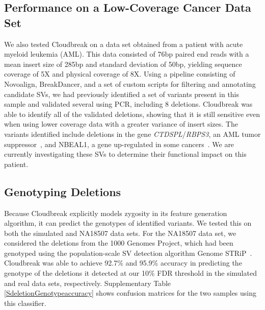 \documentclass{bioinfo}
\newcommand{\todo}[1]{}
\begin{document}
\subsection{Performance on a Low-Coverage Cancer Data Set}

We also tested Cloudbreak on a data set obtained from a patient with acute myeloid leukemia (AML). This data consisted of 76bp paired end reads with a mean insert size of 285bp and standard deviation of 50bp, yielding sequence coverage of 5X and physical coverage of 8X. Using a pipeline consisting of Novoalign, BreakDancer, and a set of custom scripts for filtering and annotating candidate SVs, we had previously identified a set of variants present in this sample and validated several using PCR, including 8 deletions. Cloudbreak was able to identify all of the validated deletions, showing that it is still sensitive even when using lower coverage data with a greater variance of insert sizes. The variants identified include deletions in the gene \emph{CTDSPL}/\emph{RBPS3}, an AML tumor suppressor~\citep{Zheng:2012kk}, and NBEAL1, a gene up-regulated in some cancers~\citep{Chen:2004jo}. We are currently investigating these SVs to determine their functional impact on this patient. 

\subsection{Genotyping Deletions}\label{section_results_genotyping}

Because Cloudbreak explicitly models zygosity in its feature generation algorithm, it can predict the genotypes of identified variants. We tested this on both the simulated and NA18507 data sets. For the NA18507 data set, we considered the deletions from the 1000 Genomes Project, which had been genotyped using the population-scale SV detection algorithm Genome STRiP~\citep{Handsaker:2011ki}. Cloudbreak was able to achieve 92.7\% and 95.9\% accuracy in predicting the genotype of the deletions it detected at our 10\% FDR threshold in the simulated and real data sets, respectively. Supplementary Table \ref{SdeletionGenotypeaccuracy} shows confusion matrices for the two samples using this classifier. \todo{None of the three input sets that made up the gold standard for NA18507 contained a sufficient number of insertions that met our size threshold and also had genotyping information. Of the 123 insertions detected by Cloudbreak on the simulated data set, 43 were heterozygous. Cloudbreak correctly classified 78 of the 80 homozygous insertions and 31 of the 43 heterozygous insertions, for an overall accuracy of 88.6\%.}
\end{document}
